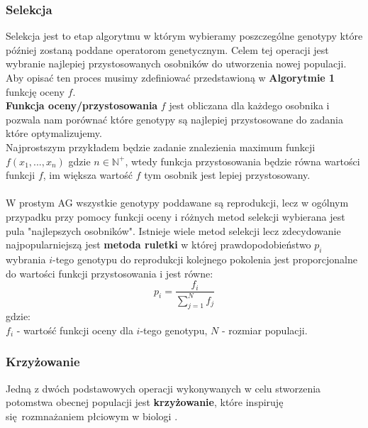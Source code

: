 \documentclass{article}
\begin{document}
\subsubsection{Selekcja}
Selekcja jest to etap algorytmu w którym wybieramy poszczególne genotypy które później zostaną 
poddane operatorom genetycznym. Celem tej operacji jest wybranie najlepiej przystosowanych
osobników do utworzenia nowej populacji.
Aby opisać ten proces musimy zdefiniować przedstawioną w \textbf{Algorytmie 1} funkcję oceny 
$f$.\\
\textbf{Funkcja oceny/przystosowania} $f$ jest obliczana dla każdego osobnika i pozwala nam
porównać które genotypy są najlepiej przystosowane do zadania które optymalizujemy.\\
Najprostszym przykładem będzie zadanie znalezienia maximum funkcji 
$f(x_1, ..., x_n)$ gdzie $n \in \mathbb{N}^{+}$, wtedy funkcja przystosowania
będzie równa wartości funkcji $f$, im większa wartość $f$ tym osobnik jest
lepiej przystosowany.\\\\
W prostym AG wszystkie genotypy poddawane są reprodukcji, lecz w ogólnym przypadku przy pomocy
funkcji oceny i różnych metod selekcji wybierana jest pula "najlepszych osobników".
Istnieje wiele metod selekcji lecz zdecydowanie najpopularniejszą jest \textbf{metoda ruletki}
w której prawdopodobieństwo $p_i$
wybrania $i$-tego genotypu do reprodukcji kolejnego pokolenia jest proporcjonalne do wartości
funkcji przystosowania i jest równe:
\begin{equation}
	p_i = \frac{f_i}{\sum_{j=1}^{N} f_j}
\end{equation}
gdzie:\\
$f_i$ - wartość funkcji oceny dla $i$-tego genotypu, $N$ - rozmiar populacji.\\

\subsubsection{Krzyżowanie}
Jedną z dwóch podstawowych operacji wykonywanych w celu stworzenia potomstwa obecnej populacji
jest \textbf{krzyżowanie}, które inspiruję się rozmnażaniem płciowym w biologi \cite{cross}.
\end{document}

